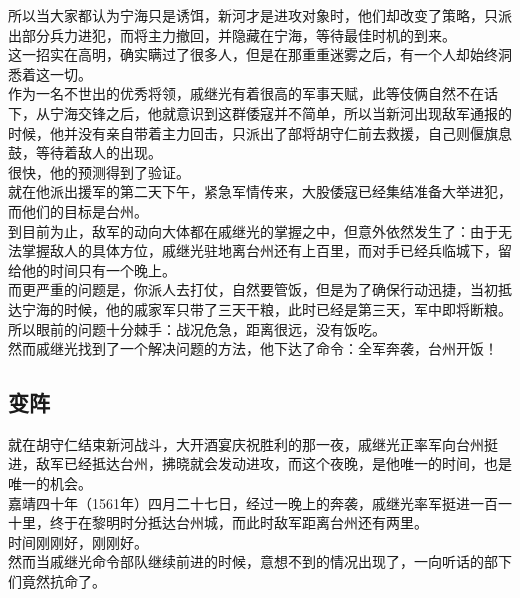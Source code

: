 \begin{multicols}{\theparacolNo}
所以当大家都认为宁海只是诱饵，新河才是进攻对象时，他们却改变了策略，只派出部分兵力进犯，而将主力撤回，并隐藏在宁海，等待最佳时机的到来。\\

这一招实在高明，确实瞒过了很多人，但是在那重重迷雾之后，有一个人却始终洞悉着这一切。\\

作为一名不世出的优秀将领，戚继光有着很高的军事天赋，此等伎俩自然不在话下，从宁海交锋之后，他就意识到这群倭寇并不简单，所以当新河出现敌军通报的时候，他并没有亲自带着主力回击，只派出了部将胡守仁前去救援，自己则偃旗息鼓，等待着敌人的出现。\\

很快，他的预测得到了验证。\\

就在他派出援军的第二天下午，紧急军情传来，大股倭寇已经集结准备大举进犯，而他们的目标是台州。\\

到目前为止，敌军的动向大体都在戚继光的掌握之中，但意外依然发生了：由于无法掌握敌人的具体方位，戚继光驻地离台州还有上百里，而对手已经兵临城下，留给他的时间只有一个晚上。\\

而更严重的问题是，你派人去打仗，自然要管饭，但是为了确保行动迅捷，当初抵达宁海的时候，他的戚家军只带了三天干粮，此时已经是第三天，军中即将断粮。\\

所以眼前的问题十分棘手：战况危急，距离很远，没有饭吃。\\

然而戚继光找到了一个解决问题的方法，他下达了命令：全军奔袭，台州开饭！\\

\subsection{变阵}
就在胡守仁结束新河战斗，大开酒宴庆祝胜利的那一夜，戚继光正率军向台州挺进，敌军已经抵达台州，拂晓就会发动进攻，而这个夜晚，是他唯一的时间，也是唯一的机会。\\

嘉靖四十年（1561年）四月二十七日，经过一晚上的奔袭，戚继光率军挺进一百一十里，终于在黎明时分抵达台州城，而此时敌军距离台州还有两里。\\

时间刚刚好，刚刚好。\\

然而当戚继光命令部队继续前进的时候，意想不到的情况出现了，一向听话的部下们竟然抗命了。\\


\end{multicols}
